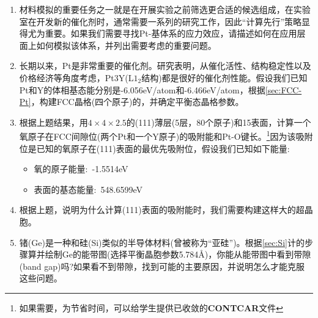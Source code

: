\begin{enumerate}
	\item 材料模拟的重要任务之一就是在开展实验之前筛选更合适的候选组成，在实验室在开发新的催化剂时，通常需要一系列的研究工作，因此“计算先行”策略显得尤为重要。如果我们需要寻找\textrm{Pt}-基体系的应力效应，请描述如何在应用层面上如何模拟该体系，并列出需要考虑的重要问题。
	\item 长期以来，\textrm{Pt}是非常重要的催化剂。研究表明，从催化活性、结构稳定性以及价格经济等角度考虑，\textrm{Pt3Y}($\mathrm{L1}_2$结构)都是很好的催化剂性能。假设我们已知\textrm{Pt}和\textrm{Y}的体相基态能分别是-6.056\textrm{eV/atom}和\textrm{-6.466}\textrm{eV/atom}，根据\ref{sec:FCC-Pt}，构建\textrm{FCC}晶格(四个原子)的，并确定平衡态晶格参数。
	\item 根据上题结果，用$4\times4\times2.5$的(111)薄层(5层，80个原子)和15表面，计算一个氧原子在\textrm{FCC}间隙位(两个\textrm{Pt}和一个\textrm{Y}原子)的吸附能和\textrm{Pt-O}键长。\footnote{如果需要，为节省时间，可以给学生提供已收敛的\textbf{CONTCAR}文件}因为该吸附位是已知的氧原子在(111)表面的最优先吸附位，假设我们已知如下能量:~\\
		\begin{itemize}
			\item 氧的原子能量:~-1.5514\textrm{eV}
			\item {}表面的基态能量:~548.6599\textrm{eV}
		\end{itemize}
	\item 根据上题，说明为什么计算(111)表面的吸附能时，我们需要构建这样大的超晶胞。
	\item 锗(\textrm{Ge})是一种和硅(\textrm{Si})类似的半导体材料(曾被称为“亚硅”)。根据\ref{sec:Si}计的步骤算并绘制\textrm{Ge}的能带图(选择平衡晶胞参数5.784\AA)，你能从能带图中看到带隙(\textrm{band gap})吗?如果看不到带隙，找到可能的主要原因，并说明怎么才能克服这些问题。
\end{enumerate}
